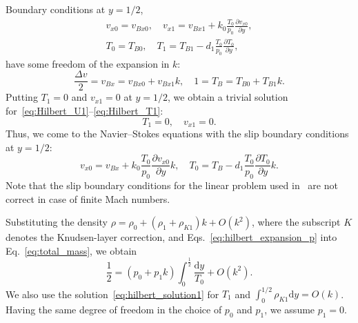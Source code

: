 \documentclass[]{jfm}
\newcommand{\dd}{\mathrm{d}}
\newcommand{\pder}[2][]{\frac{\partial#1}{\partial#2}}
\newcommand{\OO}[1]{O(#1)}
\begin{document}
Boundary conditions at \(y=1/2\),
\begin{gather}
    v_{x0} = v_{Bx0}, \quad v_{x1} = v_{Bx1} + k_0 \frac{T_0}{p_0} \pder[v_{x0}]{y}, \label{eq:hilbert_bc_U}\\
    T_0 = T_{B0}, \quad T_1 = T_{B1} - d_1 \frac{T_0}{p_0} \pder[T_0]{y}, \label{eq:hilbert_bc_T}
\end{gather}
have some freedom of the expansion in \(k\):
\begin{equation}\label{eq:hilbert_boundary_expansion}
    \frac{\Delta{v}}2 = v_{Bx} = v_{Bx0} + v_{Bx1}k, \quad 1 = T_B = T_{B0} + T_{B1}k.
\end{equation}
Putting \(T_1 = 0\) and \(v_{x1} = 0\) at \(y=1/2\), we obtain a trivial solution
for~\eqref{eq:Hilbert_U1}--\eqref{eq:Hilbert_T1}:
\begin{equation}\label{eq:hilbert_solution1}
    T_1 = 0, \quad v_{x1} = 0.
\end{equation}
Thus, we come to the Navier--Stokes equations with the slip boundary conditions at \(y=1/2\):
\begin{equation}\label{eq:hilbert_slip_bc}
    v_{x0} = v_{Bx} + k_0 \frac{T_0}{p_0} \pder[v_{x0}]{y} k, \quad
    T_0 = T_B - d_1 \frac{T_0}{p_0} \pder[T_0]{y} k.
\end{equation}
Note that the slip boundary conditions for the linear problem used in~\citet{Sharipov2000}
are not correct in case of finite Mach numbers.

Substituting the density \(\rho = \rho_0 + (\rho_1+\rho_{K1})k + \OO{k^2}\),
where the subscript \(K\) denotes the Knudsen-layer correction,
and Eqs.~\eqref{eq:hilbert_expansion_p} into Eq.~\eqref{eq:total_mass}, we obtain
\begin{equation}\label{eq:hilbert_total_mass}
    \frac12 = (p_0 + p_1k)\int_{0}^\frac12\frac{\dd y}{T_0} + \OO{k^2}.
\end{equation}
We also use the solution~\eqref{eq:hilbert_solution1} for \(T_1\) and \(\int_{0}^{1/2}\rho_{K1}\dd{y} = \OO{k}\).
Having the same degree of freedom in the choice of \(p_0\) and \(p_1\), we assume \(p_1 = 0\).
\end{document}
